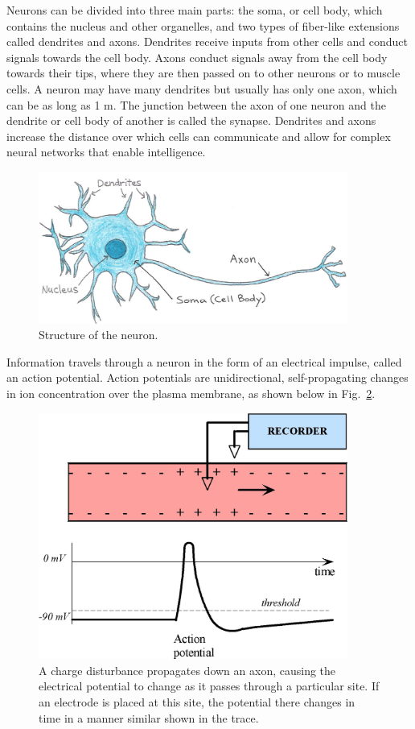 Neurons can be divided into three main parts: the soma, or cell body, which contains the nucleus and other organelles, and two types of fiber-like extensions called dendrites and axons.  Dendrites receive inputs from other cells and conduct signals towards the cell body.  Axons conduct signals away from the cell body towards their tips, where they are then passed on to other neurons or to muscle cells.  A neuron may have many dendrites but usually has only one axon, which can be as long as 1 m.  The junction between the axon of one neuron and the dendrite or cell body of another is called the synapse.  Dendrites and axons increase the distance over which cells can communicate and allow for complex neural networks that enable intelligence.    
\begin{figure}[!htb]
	\centering
	\includegraphics[width=4.0in]{./figures/Topic11/Fig11-1.jpg}
	\caption{Structure of the neuron.}
	\label{Fig11-1}
\end{figure}
Information travels through a neuron in the form of an electrical impulse, called an action potential.  Action potentials are unidirectional, self-propagating changes in ion concentration over the plasma membrane, as shown below in Fig.~\ref{Fig11-2}.
\begin{figure}[!htb]
	\centering
	\includegraphics[width=4.0in]{./figures/Topic11/Fig11-2.jpg}
	\caption{A charge disturbance propagates down an axon, causing the electrical potential to change as it passes through a particular site. If an electrode is placed at this site, the 		potential there changes in time in a manner similar shown in the trace.}
	\label{Fig11-2}
\end{figure}

